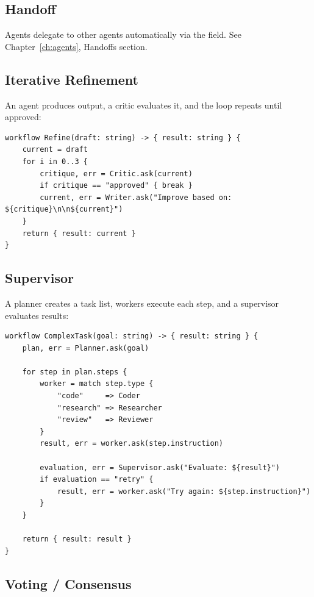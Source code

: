\subsection{Handoff}

Agents delegate to other agents automatically via the  field. See Chapter~\ref{ch:agents}, Handoffs section.

\subsection{Iterative Refinement}

An agent produces output, a critic evaluates it, and the loop repeats until approved:

\begin{lstlisting}
workflow Refine(draft: string) -> { result: string } {
    current = draft
    for i in 0..3 {
        critique, err = Critic.ask(current)
        if critique == "approved" { break }
        current, err = Writer.ask("Improve based on: ${critique}\n\n${current}")
    }
    return { result: current }
}
\end{lstlisting}

\subsection{Supervisor}

A planner creates a task list, workers execute each step, and a supervisor evaluates results:

\begin{lstlisting}
workflow ComplexTask(goal: string) -> { result: string } {
    plan, err = Planner.ask(goal)

    for step in plan.steps {
        worker = match step.type {
            "code"     => Coder
            "research" => Researcher
            "review"   => Reviewer
        }
        result, err = worker.ask(step.instruction)

        evaluation, err = Supervisor.ask("Evaluate: ${result}")
        if evaluation == "retry" {
            result, err = worker.ask("Try again: ${step.instruction}")
        }
    }

    return { result: result }
}
\end{lstlisting}

\subsection{Voting / Consensus}

